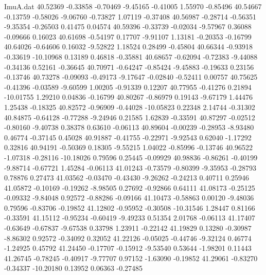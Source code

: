 \begin{filecontents}{ImuA.dat}
  40.52369   -0.33858   -0.70469   -9.45165   -0.41005    1.55970   -0.85496
  40.54667   -0.13759   -0.58026   -9.06760   -0.73827    1.07119   -0.37408
  40.56987   -0.28714   -0.56351   -9.35354   -0.26503    0.41475    0.04574
  40.59396   -0.33739   -0.02034   -9.57967    0.36088   -0.09666    0.16023
  40.61698   -0.54197    0.17707   -9.91107    1.13181   -0.20353   -0.16799
  40.64026   -0.64606    0.16032   -9.52822    1.18524    0.28499   -0.45804
  40.66344   -0.93918   -0.33619  -10.10968    0.13189    0.46818   -0.35881
  40.68657   -0.62094   -0.72383   -9.44088   -0.34136    0.52161   -0.36645
  40.70971   -0.64247   -0.85424   -9.45883   -0.19633    0.23156   -0.13746
  40.73278   -0.09093   -0.49173   -9.17647   -0.02840   -0.52411    0.00757
  40.75625   -0.41396   -0.03589   -9.60599    1.00205   -0.91339    0.12207
  40.77955   -0.41276    0.21894  -10.01755    1.29210    0.04836   -0.16799
  40.80267   -0.86979    0.19143   -9.67179    1.44476    1.25438   -0.18325
  40.82572   -0.96909   -0.44028  -10.05823    0.22348    2.14744   -0.31302
  40.84875   -0.64128   -0.77288   -9.24946    0.21585    1.62839   -0.33591
  40.87297   -0.02512   -0.80160   -9.40738    0.38378    0.63610   -0.06113
  40.89604   -0.00239   -0.28953   -8.93480    0.46774   -0.37145    0.45028
  40.91887   -0.41755   -0.22971   -9.92543    0.62040   -1.17292    0.32816
  40.94191   -0.50369    0.18305   -9.55215    1.04022   -0.85996   -0.13746
  40.96522   -1.07318   -0.28116  -10.18026    0.79596    0.25445   -0.09929
  40.98836   -0.86261   -0.40199   -9.88714   -0.67721    1.45284   -0.06113
  41.01243   -0.73579   -0.80399   -9.35953   -0.28793    0.78876    0.27473
  41.03562   -0.03470   -0.43430   -9.26262   -0.24213    0.40711    0.25946
  41.05872   -0.10169   -0.19262   -8.98505    0.27692   -0.92866    0.64111
  41.08173   -0.25125   -0.09332   -9.84048    0.92572   -0.88286   -0.09166
  41.10473   -0.58863    0.00120   -9.48036    0.79596   -0.83706   -0.19852
  41.12802   -0.95952   -0.30508  -10.31546    1.28447    0.81166   -0.33591
  41.15112   -0.95234   -0.60419   -9.49233    0.51354    2.01768   -0.06113
  41.17407   -0.63649   -0.67837   -9.67538    0.33798    1.23911   -0.22142
  41.19829    0.13280   -0.30987   -8.86302    0.92572   -0.34092    0.32052
  41.22126   -0.05025   -0.44746   -9.32124    0.46774   -1.24925    0.45792
  41.24450   -0.17707   -0.15912   -9.53540    0.53644   -1.98201    0.11443
  41.26745   -0.78245   -0.40917   -9.77707    0.97152   -1.63090   -0.19852
  41.29061   -0.83270   -0.34337  -10.20180    0.13952    0.06363   -0.27485

\end{filecontents}
